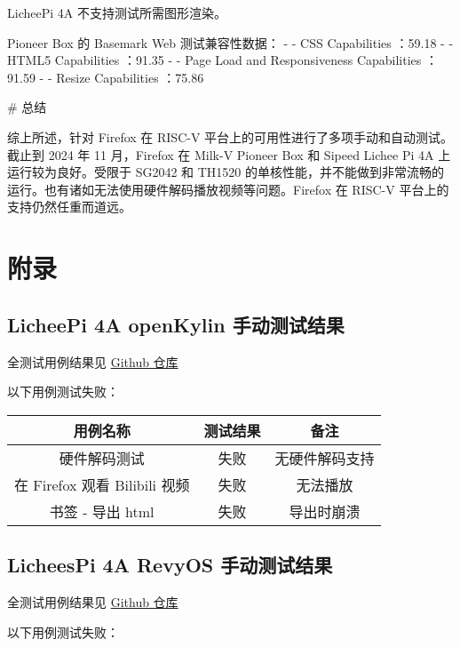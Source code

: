 \documentclass{article}
\begin{document}
\begin{markdown}
LicheePi 4A 不支持测试所需图形渲染。

Pioneer Box 的 Basemark Web 测试兼容性数据：
- - CSS Capabilities ：59.18%
- - HTML5 Capabilities ：91.35%
- - Page Load and Responsiveness Capabilities ：91.59%
- - Resize Capabilities ：75.86%

# 总结

综上所述，针对 Firefox 在 RISC-V 平台上的可用性进行了多项手动和自动测试。截止到 2024 年 11 月，Firefox 在 Milk-V Pioneer Box 和 Sipeed Lichee Pi 4A 上运行较为良好。受限于 SG2042 和 TH1520 的单核性能，并不能做到非常流畅的运行。也有诸如无法使用硬件解码播放视频等问题。Firefox 在 RISC-V 平台上的支持仍然任重而道远。


\end{markdown}

\newpage
\section{附录}

\appendix

\subsection*{LicheePi 4A openKylin 手动测试结果}

全测试用例结果见 \href{https://github.com/QA-Team-lo/firefox_test/tree/main/l_ok}{Github 仓库}

以下用例测试失败：
\begin{table}[H]
\centering
\begin{tabular}{|c|c|c|}
\hline
\textbf{用例名称} & \textbf{测试结果} & \textbf{备注} \\ \hline
硬件解码测试 & 失败 & 无硬件解码支持 \\ \hline
在 Firefox 观看 Bilibili 视频 & 失败 & 无法播放 \\ \hline
书签 - 导出 html & 失败 & 导出时崩溃 \\ \hline
\end{tabular}
\end{table}

\subsection*{LicheesPi 4A RevyOS 手动测试结果}

全测试用例结果见 \href{https://github.com/QA-Team-lo/firefox_test/tree/main/l_re}{Github 仓库}

以下用例测试失败：
\end{document}
